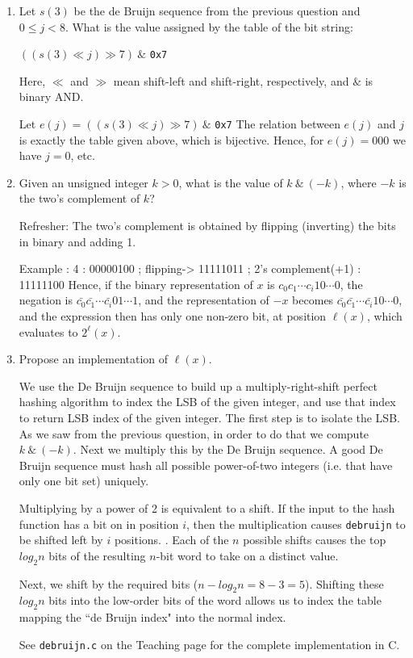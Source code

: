 \documentclass[11pt]{article}
\begin{document}
\begin{enumerate}
\item Let $s(3)$ be the de Bruijn sequence from the previous question and $0 \leq  j < 8$. What is the
value assigned by the table of the bit string:

$((s(3) \ll j) \gg 7) ~ \mathbin{ \&} $ \verb|0x7|

Here, $\ll$ and $\gg$ mean shift-left and shift-right, respectively, and $\&$ is binary AND.

\begin{solution}
	Let $e(j) = ((s(3) \ll j) \gg 7) ~ \mathbin{ \&} $ \verb|0x7|
The relation between $e(j)$ and $j$ is exactly the table given above, which is bijective. Hence, for $e(j)=000$ we have $j=0$, etc.
\end{solution}

\item Given an unsigned integer $k >0$, what is the value of $k ~ \mathbin{ \&}~ (-k)$, where $-k$
is the two’s complement of $k$?
\begin{solution}
	Refresher: The two's complement is obtained by flipping (inverting) the bits in binary and adding 1.
	
	Example : 4 : 00000100 ; flipping-> 11111011 ; 2's complement(+1) : 11111100
	Hence, if the binary representation of $x$ is $c_0c_1\cdots c_i10\cdots 0$, the negation is $\bar{c_0}\bar{c_1}\cdots\bar{c_i}01\cdots 1$, and the representation
	of $-x$ becomes  $\bar{c_0}\bar{c_1}\cdots\bar{c_i}10\cdots 0$, and the expression then has only one non-zero bit, at position $\ell(x)$, which evaluates to $2^\ell(x)$.

\end{solution}

\item Propose an implementation of $\ell(x)$.
\begin{solution}
	 We use the De Bruijn sequence to build up a multiply-right-shift perfect hashing algorithm to index the LSB of the given integer, and use that index to return LSB index of the given integer. The first step is to isolate the LSB. As we saw from the previous question, in order to do that we compute $k ~ \mathbin{ \&}~ (-k)$. 
	 Next we multiply this by the De Bruijn sequence.  A good De Bruijn sequence must hash all possible power-of-two integers (i.e. that have only one bit set) uniquely.
	 
	 Multiplying by a power of
	 2 is equivalent to a shift. If the input to the hash function has a bit on in position $i$, then
	 the multiplication causes \texttt{debruijn} to be shifted left by $i$ positions. . Each of the $n$ possible
	 shifts causes the top $log_2 n$ bits of the resulting $n$-bit word to take on a distinct value. 
	 
	 Next, we shift by the required bits ($n - log_2 n = 8-3 = 5$). Shifting
	 these  $log_2 n$  bits into the low-order bits of the word allows us to index the table mapping the ``de Bruijn index" into the normal index.
	 
	See \texttt{debruijn.c} on the Teaching page for the complete implementation in C.
	\end{solution}
	
\end{enumerate}
\end{document}
